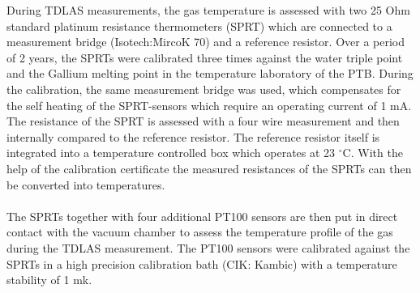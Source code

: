 During TDLAS measurements, the gas temperature is assessed with two 25 Ohm standard platinum resistance thermometers (SPRT) which are connected to a measurement bridge (Isotech:MircoK 70) and a reference resistor. Over a period of 2 years, the SPRTs were calibrated three times against the water triple point and the Gallium melting point in the temperature laboratory of the PTB. During the calibration, the same measurement bridge was used, which compensates for the self heating of the SPRT-sensors which require an operating current of 1 mA. The resistance of the SPRT is assessed with a four wire measurement and then internally compared to the reference resistor. The reference resistor itself is integrated into a temperature controlled box which operates at 23 $^{\circ}$C. With the help of the calibration certificate the measured resistances of the SPRTs can then be converted into temperatures.\\\\
\noindent
The SPRTs together with four additional PT100 sensors are then put in direct contact with the vacuum chamber to assess the temperature profile of the gas during the TDLAS measurement. The PT100 sensors were calibrated against the SPRTs in a high precision calibration bath (CIK: Kambic) with a temperature stability of 1 mk.
